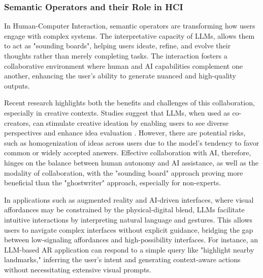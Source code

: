 
\subsubsection{ Semantic Operators and their Role in HCI}

In Human-Computer Interaction, semantic operators are transforming how users engage with complex systems.
The interpretative capacity of LLMs, allows them to act as "sounding boards", helping users ideate, refine, and evolve their thoughts rather than merely completing tasks\cite{Chen2023LargeLM}.
The interaction fosters a collaborative environment where human and AI capabilities complement one another, enhancing the user’s ability to generate nuanced and high-quality outputs.

Recent research highlights both the benefits and challenges of this collaboration, especially in creative contexts.
Studies suggest that LLMs, when used as co-creators, can stimulate creative ideation by enabling users to see diverse perspectives and enhance idea evaluation \cite{OToole2024ExtendingHC}\cite{shaer2024ai}.
However, there are potential risks, such as homogenization of ideas across users due to the model’s tendency to favor common or widely accepted answers\cite{Anderson2024HomogenizationEO}.
Effective collaboration with AI, therefore, hinges on the balance between human autonomy and AI assistance, as well as the modality of collaboration, with the "sounding board" approach proving more beneficial than the "ghostwriter" approach, especially for non-experts\cite{Chen2023LargeLM}.

In applications such as augmented reality and AI-driven interfaces, where visual affordances may be constrained by the physical-digital blend, LLMs facilitate intuitive interactions by interpreting natural language and gestures.
This allows users to navigate complex interfaces without explicit guidance, bridging the gap between low-signaling affordances and high-possibility interfaces.
For instance, an LLM-based AR application can respond to a simple query like "highlight nearby landmarks," inferring the user's intent and generating context-aware actions without necessitating extensive visual prompts.

